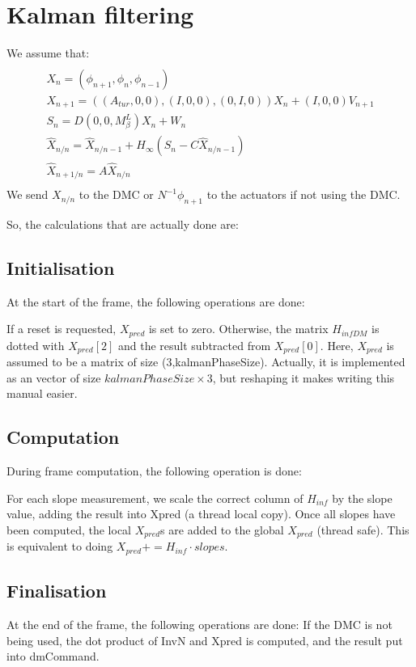 \documentclass[a4,10pt]{article}
\begin{document}
\section{Kalman filtering}
We assume that:
\begin{multline}\\
X_n=(\phi_{n+1},\phi_{n},\phi_{n-1})\\
X_{n+1} = ((A_{tur}, 0, 0), (I, 0, 0), (0, I, 0)) X_n + (I, 0, 0)
V_{n+1}\\
S_n = D (0, 0, M_\beta^L) X_n + W_n\\
\hat{X}_{n/n} = \hat{X}_{n/n-1} + H_\infty (S_n -C\hat{X}_{n/n-1})\\
\hat{X}_{n+1/n} = A\hat{X}_{n/n}\\
\end{multline}
We send $X_{n/n}$ to the DMC or $N^{-1} \phi_{n+1}$ to the actuators
if not using the DMC.

So, the calculations that are actually done are:
\subsection{Initialisation}
At the start of the frame, the following operations are done:

If a reset is requested, $X_{pred}$ is set to zero.  Otherwise, the matrix
$H_{infDM}$ is dotted with $X_{pred}[2]$ and the result subtracted from
$X_{pred}[0]$.  Here, $X_{pred}$ is assumed to be a matrix of size
(3,kalmanPhaseSize).  Actually, it is implemented as an vector of size
$kalmanPhaseSize\times 3$, but reshaping it makes writing this manual easier.


\subsection{Computation}
During frame computation, the following operation is done:

For each slope measurement, we scale the correct column of $H_{inf}$ by the
slope value, adding the result into Xpred (a thread local copy).  Once
all slopes have been computed, the local $X_{pred}$s are added to the
global $X_{pred}$ (thread safe).  This is equivalent to doing $X_{pred}+=H_{inf}
\cdot slopes$.  

\subsection{Finalisation}
At the end of the frame, the following operations are done:
If the DMC is not being used, the dot product of InvN and Xpred is
computed, and the result put into dmCommand.
\end{document}
